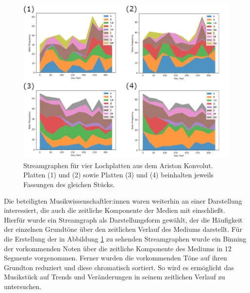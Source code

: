 \begin{figure}[t]
    \centering
    \includegraphics[width=\textwidth]{graphics/streamgraphs.png}
    \caption{Streamgraphen für vier Lochplatten aus dem Ariston Konvolut. Platten (1) und (2) sowie Platten (3) und (4) beinhalten jeweils Fassungen des gleichen Stücks.}
    \label{streamcharts}
\end{figure}

Die beteiligten Musikwissenschaftler:innen waren weiterhin an einer Darstellung interessiert, die auch die zeitliche Komponente der Medien mit einschließt.
Hierfür wurde ein Streamgraph als Darstellungsform gewählt, der die Häufigkeit der einzelnen Grundtöne über den zeitlichen Verlauf des Mediums darstellt.
Für die Erstellung der in Abbildung \ref{streamcharts} zu sehenden Streamgraphen wurde ein Binning der vorkommenden Noten über die zeitliche Komponente des Mediums in 12 Segmente vorgenommen.
Ferner wurden die vorkommenden Töne auf ihren Grundton reduziert und diese chromatisch sortiert.
So wird es ermöglicht das Musikstück auf Trends und Veränderungen in seinem zeitlichen Verlauf zu untersuchen.

